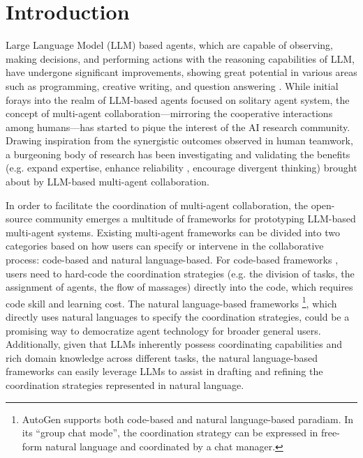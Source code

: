 
\newcommand{\overviewBox}[1]{%
\tikz[baseline=-0.5ex]{\node[rounded corners=0.2em, 
fill=white, 
draw=bdcolor, 
minimum size=0.9em, 
text=bdcolor, 
text centered,
inner sep=0pt,
line width=0.9pt,
font=\fontsize{9pt}{0.9em}\fontseries{ul}\selectfont](TsNode){#1}}}


\section{Introduction}
Large Language Model (LLM) based agents, which are capable of observing, making decisions, and performing actions with the reasoning capabilities of LLM, have undergone significant improvements, showing great potential in various areas such as programming\cite{hong2023metagpt,chetDev}, creative writing\cite{AutoAgents, wang2023unleashing, OKRagents}, and question answering \cite{wu2023empiricalMath, tang2023MedAgents}. 
While initial forays into the realm of LLM-based agents focused on solitary agent system\cite{AutoGPT,Expertprompting}, the concept of multi-agent collaboration—mirroring the cooperative interactions among humans—has started to pique the interest of the AI research community. Drawing inspiration from the synergistic outcomes observed in human teamwork\cite{engelbart2023augmenting, woolley2010evidence,luppi2022synergistic}, a burgeoning body of research has been investigating and validating the benefits (e.g. expand expertise\cite{Salewski2023InContextIR, tang2023MedAgents}, enhance reliability \cite{chan2023chateval, du2023improving_debate, chetDev}, encourage divergent thinking\cite{Encouraging_Divergent_Thinking_Debate, zhuge2023mindstorms}) brought about by LLM-based multi-agent collaboration.

In order to facilitate the coordination of multi-agent collaboration, the open-source community emerges a multitude of frameworks for prototyping LLM-based multi-agent systems. Existing multi-agent frameworks can be divided into two categories based on how users can specify or intervene in the collaborative process: code-based and natural language-based. For code-based frameworks \cite{hong2023metagpt, chetDev, wu2023autogen, CrewAI, Langroid, chen2023agentverse}, users need to hard-code the coordination strategies (e.g. the division of tasks, the assignment of agents, the flow of massages) directly into the code, which requires code skill and learning cost. The natural language-based frameworks\cite{AutoAgents, wu2023autogen} \footnote[1]{{AutoGen \cite{wu2023autogen} supports both code-based and natural language-based paradiam. In its ``group chat mode'', the coordination strategy can be expressed in free-form natural language and coordinated by a chat manager.}}, which directly uses natural languages to specify the coordination strategies, could be a promising way to democratize agent technology for broader general users. Additionally, given that LLMs inherently possess coordinating capabilities and rich domain knowledge across different tasks, the natural language-based frameworks can easily leverage LLMs to assist in drafting and refining the coordination strategies represented in natural language\cite{AutoAgents}. 

